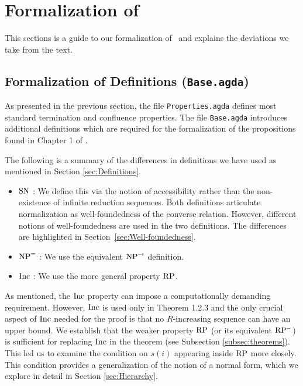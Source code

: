 \section{Formalization of \terese}
\label{sec:Formalization}
This sections is a guide to our formalization of \terese $\,$ and explains the deviations we take from the text.

\subsection{Formalization of Definitions (\texttt{Base.agda})}\label{subsec:def}

As presented in the previous section, the file \texttt{Properties.agda} defines most standard termination and confluence properties. The file \texttt{Base.agda} introduces additional definitions which are required for the formalization of the propositions found in Chapter 1 of \terese.


The following is a summary of the differences in definitions we have used as mentioned in Section \ref{sec:Definitions}.
\begin{itemize}
    \item $\mathrm{SN}$ : We define this via the notion of accessibility rather than the non-existence of infinite reduction sequences. Both definitions articulate normalization as well-foundedness of the converse relation. However, different notions of well-foundedness are used in the two definitions. The differences are highlighted in Section~\ref{sec:Well-foundedness}.
    \item $\mathrm{NP}^{=}$ : We use the equivalent $\mathrm{NP}^{\to}$ definition.
    \item $\mathrm{Inc}$ : We use the more general property $\mathrm{RP}$.
\end{itemize}

As mentioned, the $\mathrm{Inc}$ property can impose a computationally demanding requirement. However, $\mathrm{Inc}$ is used only in Theorem 1.2.3
and the only crucial aspect of $\mathrm{Inc}$ needed for the proof is that no $R$-increasing
sequence can have an upper bound.
We establish that the weaker property $\mathrm{RP}$ (or its equivalent $\mathrm{RP^{-}}$) is sufficient for replacing $\mathrm{Inc}$ in the theorem (see Subsection \ref{subsec:theorems}).
This led us to examine the condition on $s (i)$ appearing inside $\mathrm{RP}$ more closely. This condition provides a generalization of the notion of a normal form,
which we explore in detail in Section \ref{sec:Hierarchy}.

